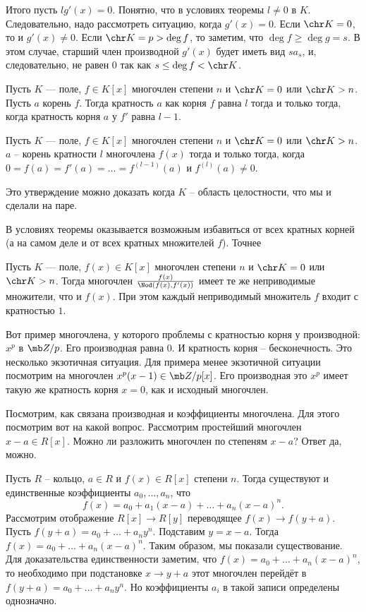 Итого пусть $lg'(x)=0$. Понятно, что в условиях теоремы $l\neq 0$ в $K$. Следовательно, надо рассмотреть ситуацию, когда $g'(x)=0$.
Если $\chr K =0$, то и $g'(x)\neq 0$. Если $\chr K =p>\deg f$, то заметим, что $\deg f \geq \deg g=s$. В этом случае, старший член производной $g'(x)$ будет иметь вид $sa_s$, и, следовательно, не равен 0 так как $s\leq \deg f < \chr K$. 
\endproof


\crl Пусть $K$ --- поле, $f\in K[x]$ многочлен степени $n$ и $\chr K = 0$ или $\chr K>n$. Пусть $a$ корень $f$. Тогда кратность  $a$ как корня $f$ равна $l$ тогда и только тогда, когда кратность корня $a$ у $f'$ равна $l-1$.
\ecrl

\crl Пусть $K$ --- поле, $f\in K[x]$ многочлен степени $n$ и $\chr K = 0$ или $\chr K>n$. $a$ -- корень кратности $l$ многочлена $f(x)$ тогда и только тогда, когда $0=f(a)=f'(a)=\dots=f^{(l-1)}(a)$ и $f^{(l)}(a)\neq 0$.
\ecrl

\rm Это утверждение можно доказать когда $K$ -- область целостности, что мы и сделали на паре.
\erm

В условиях теоремы оказывается возможным избавиться от всех кратных корней (а на самом деле и от всех кратных множителей $f$). Точнее

\crl Пусть $K$ --- поле, $f(x)\in K[x]$ многочлен степени $n$ и $\chr K = 0$ или $\chr K>n$. Тогда многочлен $\frac{f(x)}{\Nod(f(x),f'(x))}$ имеет те же неприводимые множители, что и $f(x)$. При этом каждый  неприводимый множитель $f$ входит с кратностью $1$.
\ecrl

 Вот пример многочлена, у которого проблемы с кратностью корня у производной: $x^{p}$ в $\mb Z/p$. Его производная равна 0. И кратность корня -- бесконечность. Это несколько экзотичная ситуация. Для примера менее экзотичной ситуации посмотрим на многочлен $x^p(x-1) \in \mb Z/p[x]$. Его производная это $x^p$ имеет такую же кратность корня $x=0$, как и исходный многочлен.



Посмотрим, как связана производная и коэффициенты многочлена. Для этого посмотрим вот на какой вопрос. Рассмотрим простейший многочлен $x-a \in R[x]$. Можно ли разложить многочлен по степеням $x-a$? Ответ да, можно.

\utv Пусть $R$ -- кольцо, $a\in R$  и $f(x)\in R[x]$ степени $n$. Тогда существуют и единственные коэффициенты $a_0,\dots, a_n$, что $$f(x)=a_0+a_1(x-a)+\dots+a_n(x-a)^n.$$
\proof Рассмотрим отображение $R[x] \to R[y]$ переводящее $f(x)\to f(y+a)$. Пусть $f(y+a)=a_0+\dots+a_n y^n$. Подставим $y=x-a$. Тогда $f(x)=a_0+\dots+a_n(x-a)^n$. Таким образом, мы показали существование.
Для доказательства единственности заметим, что $f(x)=a_0+\dots+a_n(x-a)^n$, то необходимо при подстановке $x\to y+a$ этот многочлен перейдёт в $f(y+a)=a_0+\dots+a_ny^n$. Но коэффициенты $a_i$ в такой записи определены однозначно.
\endproof
\eutv



